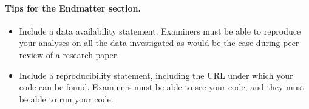 \paragraph{Tips for the Endmatter section.} 

\begin{itemize}
    \item Include a data availability statement. Examiners must be able to reproduce your analyses on all the data investigated as would be the case during peer review of a research paper.
    \item Include a reproducibility statement, including the URL under which your code can be found. Examiners must be able to see your code, and they must be able to run your code.
\end{itemize}
